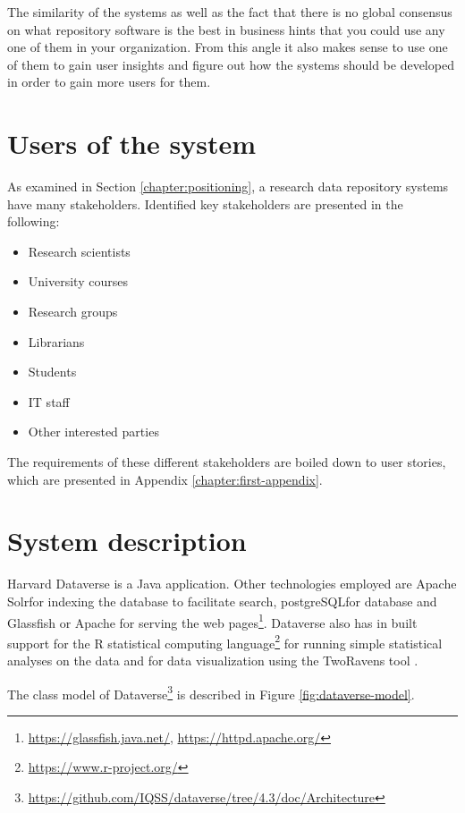 The similarity of the systems as well as the fact that there is no global
consensus on what repository software is the best in business hints that you
could use any one of them in your organization. From this angle it also makes
sense to use one of them to gain user insights and figure out how the systems
should be developed in order to gain more users for them.

\section{Users of the system}
\label{sec:users}

As examined in Section \ref{chapter:positioning}, a research data repository
systems have many stakeholders. Identified key stakeholders are presented in
the following:

\begin{itemize}
    \item Research scientists
    \item University courses
    \item Research groups
    \item Librarians
    \item Students
    \item IT staff
    \item Other interested parties
\end{itemize}

The requirements of these different stakeholders are boiled down to user
stories, which are presented in Appendix \ref{chapter:first-appendix}.

\section{System description}
\label{sec:system_description}

Harvard Dataverse is a Java application. Other technologies employed are Apache
Solr for indexing the database to facilitate search,
postgreSQL for database
and Glassfish or Apache for serving the
web pages\footnote{\url{https://glassfish.java.net/}, \url{https://httpd.apache.org/}}.
Dataverse also has in built support for the R statistical computing
language\footnote{\url{https://www.r-project.org/}} for running simple
statistical analyses on the data and for data visualization using the
TwoRavens tool \cite{DBLP:conf/ht/HonakerD14}.

The class model of
Dataverse\footnote{\label{architecture}\url{https://github.com/IQSS/dataverse/tree/4.3/doc/Architecture}}
is described in Figure \ref{fig:dataverse-model}.


